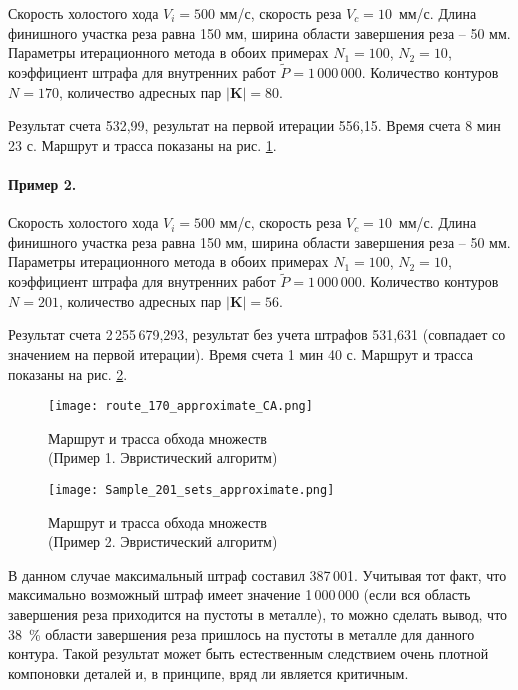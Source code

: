 Скорость холостого хода $V_i=500$ мм/с,
скорость реза $V_c=10$~мм/с.
Длина финишного участка реза равна 150 мм,
ширина области завершения реза -- 50 мм.
Параметры итерационного метода в обоих примерах
$N_1=100$, $N_2=10$,
коэффициент штрафа для внутренних работ
$\tilde{P}=1\,000\,000$.
Количество контуров $N=170$,
количество адресных пар $|\mathbf{K}|=80$.

Результат счета 532,99,
результат на первой итерации 556,15.
Время счета 8 мин 23 с.
Маршрут и трасса показаны на рис. \ref{Sample1Heuristic}.

\paragraph*{Пример 2.}

Скорость холостого хода $V_i=500$ мм/с,
скорость реза $V_c=10$~мм/с.
Длина финишного участка реза равна 150 мм,
ширина области завершения реза -- 50 мм.
Параметры итерационного метода в обоих примерах
$N_1=100$, $N_2=10$,
коэффициент штрафа для внутренних работ
$\tilde{P}=1\,000\,000$.
Количество контуров $N=201$,
количество адресных пар $|\mathbf{K}|=56$.

Результат счета 2\,255\,679,293,
результат без учета штрафов 531,631
(совпадает со значением на первой итерации).
Время счета 1 мин 40 с.
Маршрут и трасса показаны на рис. \ref{Sample2Heuristic}.

\begin{figure}[H]
  \centering
  \texttt{[image: route\_170\_approximate\_CA.png]}
  \caption{
    Маршрут и трасса обхода множеств \\
    (Пример 1. Эвристический алгоритм)
    }
  \label{Sample1Heuristic}
\end{figure}

\begin{figure}[H]
  \centering
  \texttt{[image: Sample\_201\_sets\_approximate.png]}
  \caption{
    Маршрут и трасса обхода множеств\\
    (Пример 2. Эвристический алгоритм)
    }
  \label{Sample2Heuristic}
\end{figure}

В данном случае максимальный штраф составил 387\,001.
Учитывая тот факт, что максимально возможный штраф имеет значение 1\,000\,000
(если вся область завершения реза приходится на пустоты в металле),
то можно сделать вывод, что 38~\% области
завершения реза пришлось на пустоты в металле для данного контура.
Такой результат может быть естественным следствием очень плотной компоновки деталей
и, в принципе, вряд ли является критичным.

